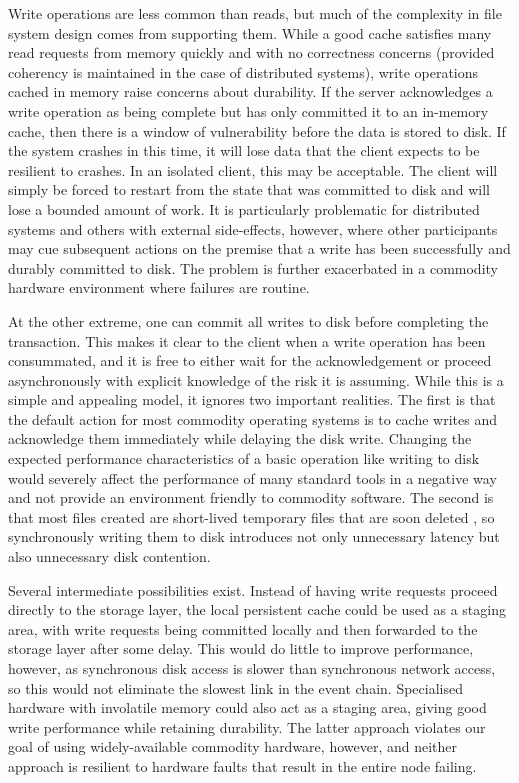 Write operations are less common than reads, but much of the complexity in file system design comes from supporting them. While a good cache satisfies many read requests from memory quickly and with no correctness concerns (provided coherency is maintained in the case of distributed systems), write operations cached in memory raise concerns about durability. If the server acknowledges a write operation as being complete but has only committed it to an in-memory cache, then there is a window of vulnerability before the data is stored to disk. If the system crashes in this time, it will lose data that the client expects to be resilient to crashes. In an isolated client, this may be acceptable. The client will simply be forced to restart from the state that was committed to disk and will lose a bounded amount of work. It is particularly problematic for distributed systems and others with external side-effects, however, where other participants may cue subsequent actions on the premise that a write has been successfully and durably committed to disk. The problem is further exacerbated in a commodity hardware environment where failures are routine.

At the other extreme, one can commit all writes to disk before completing the transaction. This makes it clear to the client when a write operation has been consummated, and it is free to either wait for the acknowledgement or proceed asynchronously with explicit knowledge of the risk it is assuming. While this is a simple and appealing model, it ignores two important realities. The first is that the default action for most commodity operating systems is to cache writes and acknowledge them immediately while delaying the disk write. Changing the expected performance characteristics of a basic operation like writing to disk would severely affect the performance of many standard tools in a negative way and not provide an environment friendly to commodity software. The second is that most files created are short-lived temporary files that are soon deleted \cite{ousterhout}, so synchronously writing them to disk introduces not only unnecessary latency but also unnecessary disk contention.

Several intermediate possibilities exist. Instead of having write requests proceed directly to the storage layer, the local persistent cache could be used as a staging area, with write requests being committed locally and then forwarded to the storage layer after some delay. This would do little to improve performance, however, as synchronous disk access is slower than synchronous network access, so this would not eliminate the slowest link in the event chain. Specialised hardware with involatile memory could also act as a staging area, giving good write performance while retaining durability. The latter approach violates our goal of using widely-available commodity hardware, however, and neither approach is resilient to hardware faults that result in the entire node failing.

